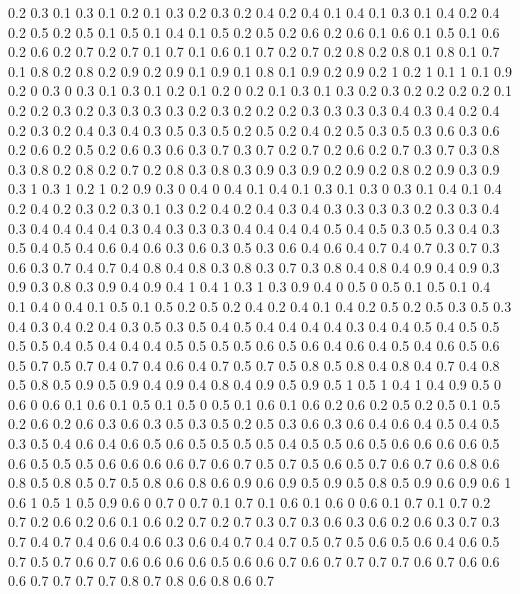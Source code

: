 0.2 0.3
0.1 0.3
0.1 0.2
0.1 0.3
0.2 0.3
0.2 0.4
0.2 0.4
0.1 0.4
0.1 0.3
0.1 0.4
0.2 0.4
0.2 0.5
0.2 0.5
0.1 0.5
0.1 0.4
0.1 0.5
0.2 0.5
0.2 0.6
0.2 0.6
0.1 0.6
0.1 0.5
0.1 0.6
0.2 0.6
0.2 0.7
0.2 0.7
0.1 0.7
0.1 0.6
0.1 0.7
0.2 0.7
0.2 0.8
0.2 0.8
0.1 0.8
0.1 0.7
0.1 0.8
0.2 0.8
0.2 0.9
0.2 0.9
0.1 0.9
0.1 0.8
0.1 0.9
0.2 0.9
0.2 1
0.2 1
0.1 1
0.1 0.9
0.2 0
0.3 0
0.3 0.1
0.3 0.1
0.2 0.1
0.2 0
0.2 0.1
0.3 0.1
0.3 0.2
0.3 0.2
0.2 0.2
0.2 0.1
0.2 0.2
0.3 0.2
0.3 0.3
0.3 0.3
0.2 0.3
0.2 0.2
0.2 0.3
0.3 0.3
0.3 0.4
0.3 0.4
0.2 0.4
0.2 0.3
0.2 0.4
0.3 0.4
0.3 0.5
0.3 0.5
0.2 0.5
0.2 0.4
0.2 0.5
0.3 0.5
0.3 0.6
0.3 0.6
0.2 0.6
0.2 0.5
0.2 0.6
0.3 0.6
0.3 0.7
0.3 0.7
0.2 0.7
0.2 0.6
0.2 0.7
0.3 0.7
0.3 0.8
0.3 0.8
0.2 0.8
0.2 0.7
0.2 0.8
0.3 0.8
0.3 0.9
0.3 0.9
0.2 0.9
0.2 0.8
0.2 0.9
0.3 0.9
0.3 1
0.3 1
0.2 1
0.2 0.9
0.3 0
0.4 0
0.4 0.1
0.4 0.1
0.3 0.1
0.3 0
0.3 0.1
0.4 0.1
0.4 0.2
0.4 0.2
0.3 0.2
0.3 0.1
0.3 0.2
0.4 0.2
0.4 0.3
0.4 0.3
0.3 0.3
0.3 0.2
0.3 0.3
0.4 0.3
0.4 0.4
0.4 0.4
0.3 0.4
0.3 0.3
0.3 0.4
0.4 0.4
0.4 0.5
0.4 0.5
0.3 0.5
0.3 0.4
0.3 0.5
0.4 0.5
0.4 0.6
0.4 0.6
0.3 0.6
0.3 0.5
0.3 0.6
0.4 0.6
0.4 0.7
0.4 0.7
0.3 0.7
0.3 0.6
0.3 0.7
0.4 0.7
0.4 0.8
0.4 0.8
0.3 0.8
0.3 0.7
0.3 0.8
0.4 0.8
0.4 0.9
0.4 0.9
0.3 0.9
0.3 0.8
0.3 0.9
0.4 0.9
0.4 1
0.4 1
0.3 1
0.3 0.9
0.4 0
0.5 0
0.5 0.1
0.5 0.1
0.4 0.1
0.4 0
0.4 0.1
0.5 0.1
0.5 0.2
0.5 0.2
0.4 0.2
0.4 0.1
0.4 0.2
0.5 0.2
0.5 0.3
0.5 0.3
0.4 0.3
0.4 0.2
0.4 0.3
0.5 0.3
0.5 0.4
0.5 0.4
0.4 0.4
0.4 0.3
0.4 0.4
0.5 0.4
0.5 0.5
0.5 0.5
0.4 0.5
0.4 0.4
0.4 0.5
0.5 0.5
0.5 0.6
0.5 0.6
0.4 0.6
0.4 0.5
0.4 0.6
0.5 0.6
0.5 0.7
0.5 0.7
0.4 0.7
0.4 0.6
0.4 0.7
0.5 0.7
0.5 0.8
0.5 0.8
0.4 0.8
0.4 0.7
0.4 0.8
0.5 0.8
0.5 0.9
0.5 0.9
0.4 0.9
0.4 0.8
0.4 0.9
0.5 0.9
0.5 1
0.5 1
0.4 1
0.4 0.9
0.5 0
0.6 0
0.6 0.1
0.6 0.1
0.5 0.1
0.5 0
0.5 0.1
0.6 0.1
0.6 0.2
0.6 0.2
0.5 0.2
0.5 0.1
0.5 0.2
0.6 0.2
0.6 0.3
0.6 0.3
0.5 0.3
0.5 0.2
0.5 0.3
0.6 0.3
0.6 0.4
0.6 0.4
0.5 0.4
0.5 0.3
0.5 0.4
0.6 0.4
0.6 0.5
0.6 0.5
0.5 0.5
0.5 0.4
0.5 0.5
0.6 0.5
0.6 0.6
0.6 0.6
0.5 0.6
0.5 0.5
0.5 0.6
0.6 0.6
0.6 0.7
0.6 0.7
0.5 0.7
0.5 0.6
0.5 0.7
0.6 0.7
0.6 0.8
0.6 0.8
0.5 0.8
0.5 0.7
0.5 0.8
0.6 0.8
0.6 0.9
0.6 0.9
0.5 0.9
0.5 0.8
0.5 0.9
0.6 0.9
0.6 1
0.6 1
0.5 1
0.5 0.9
0.6 0
0.7 0
0.7 0.1
0.7 0.1
0.6 0.1
0.6 0
0.6 0.1
0.7 0.1
0.7 0.2
0.7 0.2
0.6 0.2
0.6 0.1
0.6 0.2
0.7 0.2
0.7 0.3
0.7 0.3
0.6 0.3
0.6 0.2
0.6 0.3
0.7 0.3
0.7 0.4
0.7 0.4
0.6 0.4
0.6 0.3
0.6 0.4
0.7 0.4
0.7 0.5
0.7 0.5
0.6 0.5
0.6 0.4
0.6 0.5
0.7 0.5
0.7 0.6
0.7 0.6
0.6 0.6
0.6 0.5
0.6 0.6
0.7 0.6
0.7 0.7
0.7 0.7
0.6 0.7
0.6 0.6
0.6 0.7
0.7 0.7
0.7 0.8
0.7 0.8
0.6 0.8
0.6 0.7
